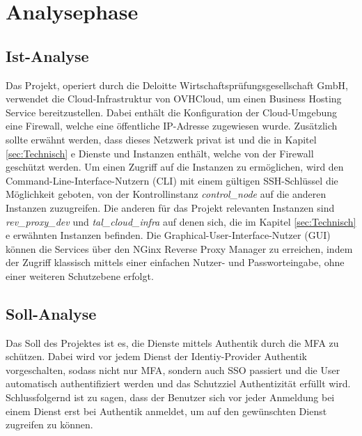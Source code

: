 \section{Analysephase} 
\label{sec:Analysephase}


\subsection{Ist-Analyse} 
\label{sec:IstAnalyse}
Das Projekt, operiert durch die Deloitte Wirtschaftsprüfungsgesellschaft GmbH, verwendet die Cloud-Infrastruktur 
von OVHCloud, um einen Business Hosting Service bereitzustellen. Dabei enthält die Konfiguration der 
Cloud-Umgebung eine Firewall, welche eine öffentliche IP-Adresse zugewiesen wurde. Zusätzlich sollte erwähnt werden, 
dass dieses Netzwerk privat ist und die in Kapitel \ref{sec:Technisch} e  
Dienste und Instanzen enthält, welche von der Firewall geschützt werden.
Um einen Zugriff auf die Instanzen zu ermöglichen, wird den Command-Line-Interface-Nutzern (\acs{CLI}) mit einem gültigen
SSH-Schlüssel die Möglichkeit geboten, von der Kontrollinstanz \textit{control\_node} auf die anderen Instanzen 
zuzugreifen. Die anderen für das Projekt relevanten Instanzen sind \textit{rev\_proxy\_dev} und \textit{tal\_cloud\_infra} 
auf denen sich, die im Kapitel \ref*{sec:Technisch} e  
erwähnten Instanzen befinden. Die Graphical-User-Interface-Nutzer (\acs{GUI}) können die Services über den NGinx Reverse Proxy Manager 
zu erreichen, indem der Zugriff klassisch mittels einer einfachen Nutzer- und Passworteingabe, ohne einer weiteren 
Schutzebene erfolgt.

\subsection{Soll-Analyse}
\label{sec:SollAnalyse}
Das Soll des Projektes ist es, die Dienste mittels Authentik durch die \acs{MFA} zu schützen. Dabei wird vor jedem Dienst 
der Identiy-Provider Authentik vorgeschalten, sodass nicht nur \acs{MFA}, sondern auch \acs{SSO} passiert und die User automatisch 
authentifiziert werden und das Schutzziel Authentizität erfüllt wird.
\\Schlussfolgernd ist zu sagen, dass der Benutzer sich vor jeder Anmeldung bei einem Dienst erst bei Authentik 
anmeldet, um auf den gewünschten Dienst zugreifen zu können.




